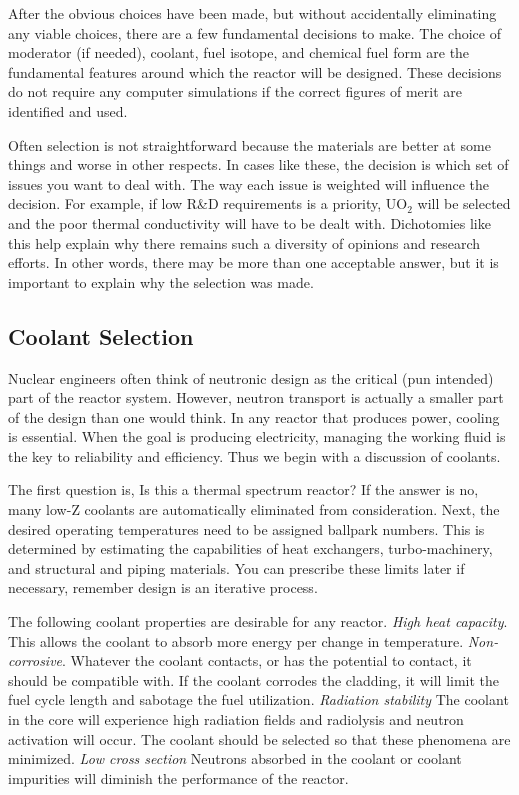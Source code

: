 After the obvious choices have been made, but without accidentally eliminating any viable choices, there are a few fundamental decisions to make. The choice of moderator (if needed), coolant, fuel isotope, and chemical fuel form are the fundamental features around which the reactor will be designed. These decisions do not require any computer simulations if the correct figures of merit are identified and used. 

Often selection is not straightforward because the materials are better at some things and worse in other respects. In cases like these, the decision is which set of issues you want to deal with.
The way each issue is weighted will influence the decision. For example, if low R\&D requirements is a priority, UO$_2$ will be selected and the poor thermal conductivity will have to be dealt with. 
Dichotomies like this help explain why there remains such a diversity of opinions and research efforts.
In other words, there may be more than one acceptable answer, but it is important to explain why the selection was made.


\subsection{Coolant Selection}
Nuclear engineers often think of neutronic design as the critical (pun intended) part of the reactor system. However, neutron transport is actually a smaller part of the design than one would think.
In any reactor that produces power, cooling is essential. When the goal is producing electricity, managing the working fluid is the key to reliability and efficiency. Thus we begin with a discussion of coolants.

The first question is, Is this a thermal spectrum reactor? If the answer is no, many low-Z coolants are automatically eliminated from consideration.
Next, the desired operating temperatures need to be assigned ballpark numbers. This is determined by estimating the capabilities of heat exchangers, turbo-machinery, and structural and piping materials. You can prescribe these limits later if necessary, remember design is an iterative process. 

The following coolant properties are desirable for any reactor. \emph{High heat capacity}. This allows the coolant to absorb more energy per change in temperature. \emph{Non-corrosive}. Whatever the coolant contacts, or has the potential to contact, it should be compatible with. If the coolant corrodes the cladding, it will limit the fuel cycle length and sabotage the fuel utilization. \emph{Radiation stability} The coolant in the core will experience high radiation fields and radiolysis and neutron activation will occur. The coolant should be selected so that these phenomena are minimized. \emph{Low cross section} Neutrons absorbed in the coolant or coolant impurities will diminish the performance of the reactor.%

